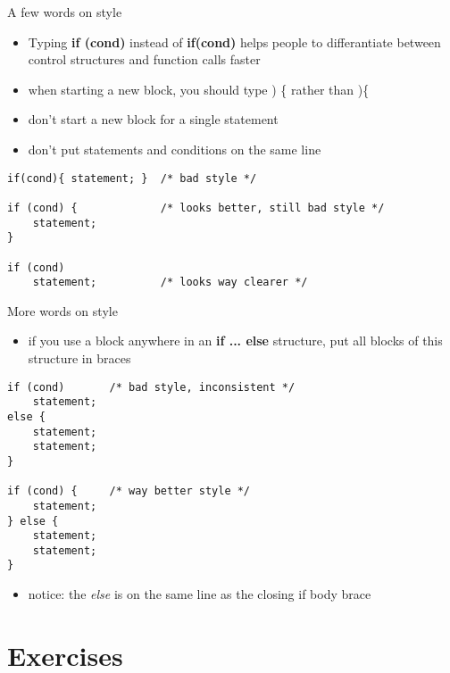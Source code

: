 \begin{frame}[fragile]{A few words on style}

	\begin{itemize}
		\item Typing \textbf{if (cond)} instead of \textbf{if(cond)} helps people to differantiate between control structures and function calls faster
		\item when starting a new block, you should type ) \{ rather than )\{
		\item don't start a new block for a single statement
		\item don't put statements and conditions on the same line
	\end{itemize}
	\begin{lstlisting}[numbers=none]
if(cond){ statement; }	/* bad style */

if (cond) {				/* looks better, still bad style */
	statement;
}

if (cond)
	statement;			/* looks way clearer */
\end{lstlisting}
\end{frame}
\begin{frame}[fragile]{More words on style}
	\begin{itemize}
		\item if you use a block anywhere in an \textbf{if ... else} structure, put all blocks of this structure in braces
	\end{itemize}
	\begin{lstlisting}[numbers=none]
if (cond)		/* bad style, inconsistent */
	statement;
else {
	statement;
	statement;
}

if (cond) {		/* way better style */
	statement;
} else {
	statement;
	statement;
}
\end{lstlisting}
	\begin{itemize}
		\item notice: the \textit{else} is on the same line as the closing if body brace
	\end{itemize}
\end{frame}
\section{Exercises}
